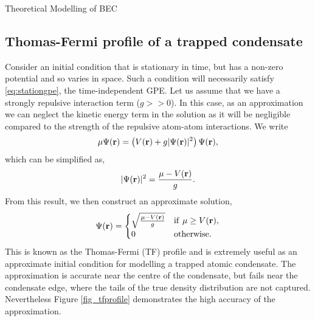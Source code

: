 \begin{chapter}{\label{cha:theoretical_model}Theoretical Modelling of BEC}
	\subsection{\label{section:tftrap} Thomas-Fermi profile of a trapped condensate}
	Consider an initial condition that is stationary in time, but has a non-zero potential and so varies in space. Such a condition will necessarily satisfy \ref{eq:stationgpe}, the time-independent GPE. Let us assume that we have a strongly repulsive interaction term ($g>>0$). In this case, as an approximation we can neglect the kinetic energy term in the solution as it will be negligible compared to the strength of the repulsive atom-atom interactions. We write
	\begin{equation}
		\mu\Psi({\bf r}) = \left(V({\bf r}) + g|\Psi({\bf r})|^2  \right) \Psi({\bf r}),
	\end{equation}
	which can be simplified as,
	\begin{equation}
	 |\Psi({\bf r})|^2=\frac{\mu - V({\bf r})}{g}.
	\end{equation}
	From this result, we then construct an approximate solution,
	\begin{equation}
	\Psi({\bf r}) =
	\begin{cases} 
    \sqrt{\frac{\mu - V({\bf r})}{g}} & \mathrm{if}~\mu\geq V({\bf r}), \\
    0 & \mathrm{otherwise}.
  \end{cases}
  \end{equation}
	This is known as the Thomas-Fermi (TF) profile and is extremely useful as an approximate initial condition for modelling a trapped atomic condensate. The approximation is accurate near the centre of the condensate, but fails near the condensate edge, where the tails of the true density distribution are not captured. Nevertheless Figure \ref{fig_tfprofile} demonstrates the high accuracy of the approximation.
	\begin{figure}
	\centering
\end{figure}
\end{chapter}
